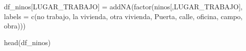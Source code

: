 \documentclass[
]{article}
\newenvironment{Shaded}{\begin{snugshade}}{\end{snugshade}}
\newcommand{\AttributeTok}[1]{\textcolor[rgb]{0.77,0.63,0.00}{#1}}
\newcommand{\FunctionTok}[1]{\textcolor[rgb]{0.00,0.00,0.00}{#1}}
\newcommand{\NormalTok}[1]{#1}
\newcommand{\OtherTok}[1]{\textcolor[rgb]{0.56,0.35,0.01}{#1}}
\newcommand{\StringTok}[1]{\textcolor[rgb]{0.31,0.60,0.02}{#1}}
\begin{document}
\begin{Shaded}
\begin{Highlighting}[]
\NormalTok{df\_ninos[}\StringTok{\textquotesingle{}LUGAR\_TRABAJO\textquotesingle{}}\NormalTok{] }\OtherTok{=} \FunctionTok{addNA}\NormalTok{(}\FunctionTok{factor}\NormalTok{(ninos[,}\StringTok{\textquotesingle{}LUGAR\_TRABAJO\textquotesingle{}}\NormalTok{], }
                                         \AttributeTok{labels =} \FunctionTok{c}\NormalTok{(}\StringTok{\textquotesingle{}no trabajo\textquotesingle{}}\NormalTok{, }\StringTok{\textquotesingle{}la vivienda\textquotesingle{}}\NormalTok{,}
                                                    \StringTok{\textquotesingle{}otra vivienda\textquotesingle{}}\NormalTok{, }\StringTok{\textquotesingle{}Puerta\textquotesingle{}}\NormalTok{, }
                                                    \StringTok{\textquotesingle{}calle\textquotesingle{}}\NormalTok{, }\StringTok{\textquotesingle{}oficina\textquotesingle{}}\NormalTok{, }\StringTok{\textquotesingle{}campo\textquotesingle{}}\NormalTok{,}
                                                    \StringTok{\textquotesingle{}obra\textquotesingle{}}\NormalTok{)))}

\FunctionTok{head}\NormalTok{(df\_ninos)}
\end{Highlighting}
\end{Shaded}
\end{document}
